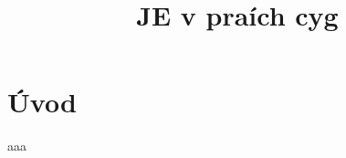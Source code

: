 \documentclass{report}
\title{JE v praích cyg}
\begin{document}
\maketitle

\tableofcontents

\section{Úvod}
aaa




\end{document}

